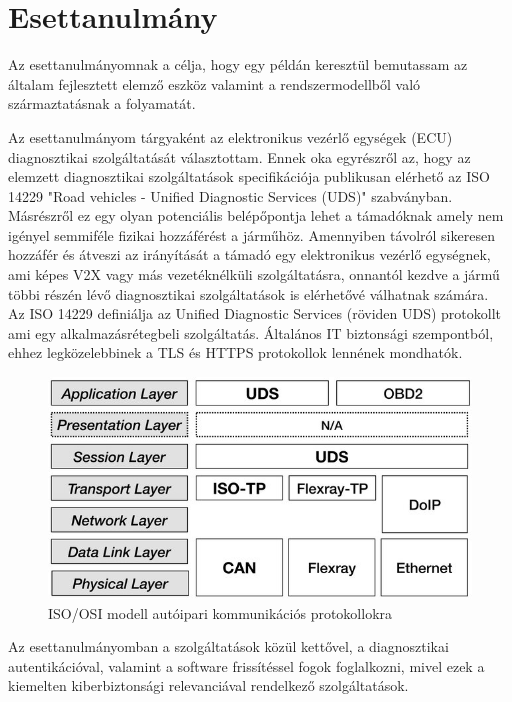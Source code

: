 \chapter{Esettanulmány}

Az esettanulmányomnak a célja, hogy egy példán keresztül bemutassam az általam fejlesztett elemző eszköz valamint a rendszermodellből való származtatásnak a folyamatát.

Az esettanulmányom tárgyaként az elektronikus vezérlő egységek (ECU) diagnosztikai szolgáltatását választottam. Ennek oka egyrészről az, hogy az elemzett diagnosztikai szolgáltatások specifikációja publikusan elérhető az ISO 14229 "Road vehicles - Unified Diagnostic Services (UDS)" \cite{ISO14229} szabványban. Másrészről ez egy olyan potenciális belépőpontja lehet a támadóknak amely nem igényel semmiféle fizikai hozzáférést a járműhöz. Amennyiben távolról sikeresen hozzáfér és átveszi az irányítását a támadó egy elektronikus vezérlő egységnek, ami képes V2X vagy más vezetéknélküli szolgáltatásra, onnantól kezdve a jármű többi részén lévő diagnosztikai szolgáltatások is elérhetővé válhatnak számára.\\

Az ISO 14229 \cite{ISO14229} definiálja az Unified Diagnostic Services (röviden UDS) protokollt ami egy alkalmazásrétegbeli szolgáltatás. Általános IT biztonsági szempontból, ehhez legközelebbinek a TLS és HTTPS protokollok lennének mondhatók.

\begin{figure}[!ht]
	\centering
	\includegraphics[width=120mm, keepaspectratio]{figures/06_isoosi.jpg}
	\caption{ISO/OSI modell autóipari kommunikációs protokollokra \cite{ISOOSI}}
\end{figure}

Az esettanulmányomban a szolgáltatások közül kettővel, a diagnosztikai autentikációval, valamint a software frissítéssel fogok foglalkozni, mivel ezek a kiemelten kiberbiztonsági relevanciával rendelkező szolgáltatások.\\

